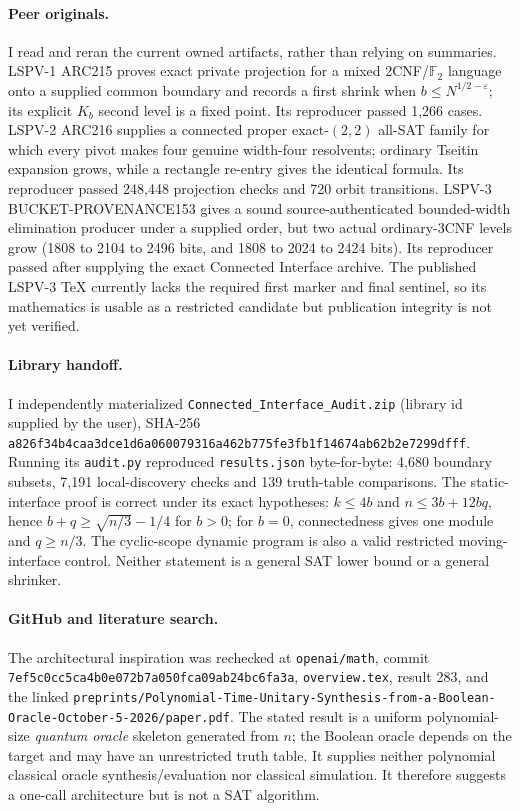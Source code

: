 \documentclass[11pt]{article}
\begin{document}
\paragraph{Peer originals.}
I read and reran the current owned artifacts, rather than relying on summaries.
LSPV-1 ARC215 proves exact private projection for a mixed 2CNF/$\mathbb F_2$ language onto a supplied common boundary and records a first shrink when $b\le N^{1/2-\varepsilon}$; its explicit $K_b$ second level is a fixed point.  Its reproducer passed 1,266 cases.  LSPV-2 ARC216 supplies a connected proper exact-$(2,2)$ all-SAT family for which every pivot makes four genuine width-four resolvents; ordinary Tseitin expansion grows, while a rectangle re-entry gives the identical formula.  Its reproducer passed 248,448 projection checks and 720 orbit transitions.  LSPV-3 BUCKET-PROVENANCE153 gives a sound source-authenticated bounded-width elimination producer under a supplied order, but two actual ordinary-3CNF levels grow (1808 to 2104 to 2496 bits, and 1808 to 2024 to 2424 bits).  Its reproducer passed after supplying the exact Connected Interface archive.  The published LSPV-3 TeX currently lacks the required first marker and final sentinel, so its mathematics is usable as a restricted candidate but publication integrity is not yet verified.

\paragraph{Library handoff.}
I independently materialized \texttt{Connected\_Interface\_Audit.zip} (library id supplied by the user), SHA-256
\texttt{a826f34b4caa3dce1d6a060079316a462b775fe3fb1f14674ab62b2e7299dfff}.
Running its \texttt{audit.py} reproduced \texttt{results.json} byte-for-byte: 4,680 boundary subsets, 7,191 local-discovery checks and 139 truth-table comparisons.  The static-interface proof is correct under its exact hypotheses: $k\le4b$ and $n\le3b+12bq$, hence $b+q\ge\sqrt{n/3}-1/4$ for $b>0$; for $b=0$, connectedness gives one module and $q\ge n/3$.  The cyclic-scope dynamic program is also a valid restricted moving-interface control.  Neither statement is a general SAT lower bound or a general shrinker.

\paragraph{GitHub and literature search.}
The architectural inspiration was rechecked at \texttt{openai/math}, commit
\texttt{7ef5c0cc5ca4b0e072b7a050fca09ab24bc6fa3a},
\texttt{overview.tex}, result 283, and the linked
\texttt{preprints/Polynomial-Time-Unitary-Synthesis-from-a-Boolean-Oracle-October-5-2026/paper.pdf}.
The stated result is a uniform polynomial-size \emph{quantum oracle} skeleton generated from $n$; the Boolean oracle depends on the target and may have an unrestricted truth table.  It supplies neither polynomial classical oracle synthesis/evaluation nor classical simulation.  It therefore suggests a one-call architecture but is not a SAT algorithm.
\end{document}
